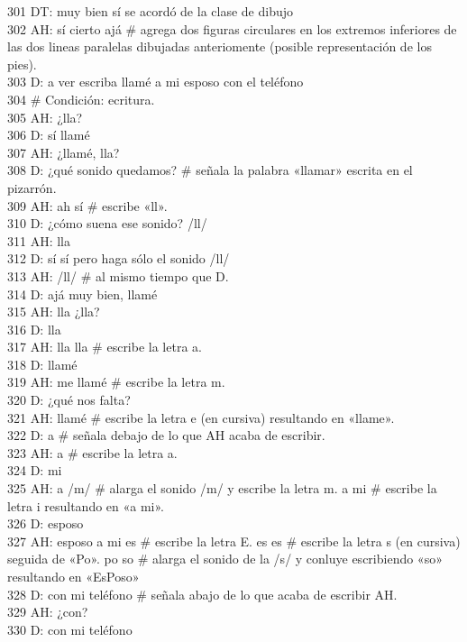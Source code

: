 301 DT: muy bien sí se acordó de la clase de dibujo\\
302 AH: sí cierto ajá \# agrega dos figuras circulares en los extremos inferiores de las dos lineas paralelas dibujadas anteriomente (posible representación de los pies).\\
303 D: a ver escriba llamé a mi esposo con el teléfono\\
304 \# Condición: ecritura.\\
305 AH: ¿lla?\\
306 D: sí llamé\\
307 AH: ¿llamé, lla?\\
308 D: ¿qué sonido quedamos? \# señala la palabra «llamar» escrita en el pizarrón.\\
309 AH: ah sí \# escribe «ll».\\
310 D: ¿cómo suena ese sonido? /ll/\\
311 AH: lla\\
312 D: sí sí pero haga sólo el sonido /ll/\\
313 AH: /ll/ \# al mismo tiempo que D.\\
314 D: ajá muy bien, llamé\\
315 AH: lla ¿lla?\\
316 D: lla\\
317 AH: lla lla \# escribe la letra a.\\
318 D: llamé\\
319 AH: me llamé \# escribe la letra m.\\
320 D: ¿qué nos falta?\\
321 AH: llamé \# escribe la letra e (en cursiva) resultando en «llame».\\
322 D: a \# señala debajo de lo que AH acaba de escribir.\\
323 AH: a \# escribe la letra a.\\
324 D: mi\\
325 AH: a /m/ \# alarga el sonido /m/ y escribe la letra m. a mi \# escribe la letra i resultando en «a mi».\\
326 D: esposo\\
327 AH: esposo a mi es \# escribe la letra E. es es \# escribe la letra s (en cursiva) seguida de «Po». po so \# alarga el sonido de la /s/ y conluye escribiendo «so» resultando en «EsPoso»\\
328 D: con mi teléfono \# señala abajo de lo que acaba de escribir AH.\\
329 AH: ¿con?\\
330 D: con mi teléfono\\
